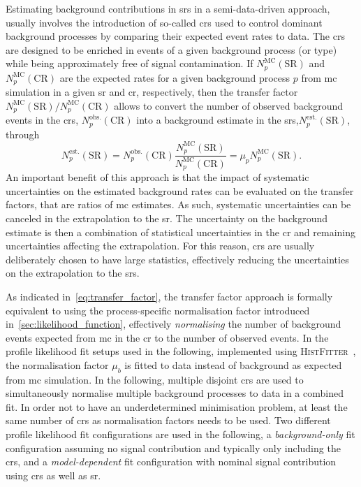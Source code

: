 Estimating background contributions in \glspl{sr} in a semi-data-driven approach, usually involves the introduction of so-called \glspl{cr} used to control dominant background processes by comparing their expected event rates to data. The \glspl{cr} are designed to be enriched in events of a given background process (or type) while being approximately free of signal contamination. If $N_p^\mathrm{MC}(\mathrm{SR})$ and $N_p^\mathrm{MC}(\mathrm{CR})$ are the expected rates for a given background process $p$ from \gls{mc} simulation in a given \gls{sr} and \gls{cr}, respectively, then the transfer factor $N_p^\mathrm{MC}(\mathrm{SR})/N_p^\mathrm{MC}(\mathrm{CR})$ allows to convert the number of observed background events in the \glspl{cr}, $N_p^\mathrm{obs.}(\mathrm{CR})$ into a background estimate in the \glspl{sr},$N_p^\mathrm{est.}(\mathrm{SR})$, through
\begin{equation}
	N_p^\mathrm{est.}(\mathrm{SR}) = N_p^\mathrm{obs.}(\mathrm{CR}) \frac{N_p^\mathrm{MC}(\mathrm{SR})}{N_p^\mathrm{MC}(\mathrm{CR})} = \mu_p N_p^\mathrm{MC}(\mathrm{SR}).
	\label{eq:transfer_factor}
\end{equation}
An important benefit of this approach is that the impact of systematic uncertainties on the estimated background rates can be evaluated on the transfer factors, that are ratios of \gls{mc} estimates. As such, systematic uncertainties can be canceled in the extrapolation to the \gls{sr}. The uncertainty on the background estimate is then a combination of statistical uncertainties in the \gls{cr} and remaining uncertainties affecting the extrapolation. For this reason, \glspl{cr} are usually deliberately chosen to have large statistics, effectively reducing the uncertainties on the extrapolation to the \glspl{sr}.  

As indicated in~\cref{eq:transfer_factor}, the transfer factor approach is formally equivalent to using the process-specific normalisation factor introduced in~\cref{sec:likelihood_function}, effectively \textit{normalising} the number of background events expected from \gls{mc} in the \gls{cr} to the number of observed events. In the profile likelihood fit setups used in the following, implemented using \textsc{HistFitter}~\cite{HistFitter:2014wma}, the normalisation factor $\mu_b$ is fitted to data instead of background as expected from \gls{mc} simulation. In the following, multiple disjoint \glspl{cr} are used to simultaneously normalise multiple background processes to data in a combined fit. In order not to have an underdetermined minimisation problem, at least the same number of \glspl{cr} as normalisation factors needs to be used. Two different profile likelihood fit configurations are used in the following, a \textit{background-only} fit configuration assuming no signal contribution and typically only including the \glspl{cr}, and a \textit{model-dependent} fit configuration with nominal signal contribution using \glspl{cr} as well as \gls{sr}.

